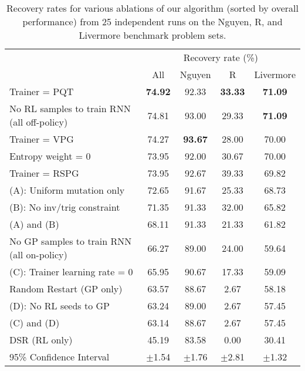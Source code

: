 \documentclass{article}
\begin{document}
\begin{table}[t]
  \centering
  \caption{Recovery rates for various ablations of our algorithm (sorted by overall performance) from 25 independent runs on the Nguyen, R, and Livermore benchmark problem sets.}
    \begin{tabular}{lcccc}
    & \multicolumn{4}{c}{Recovery rate (\%)} \\
    & All & Nguyen & R & Livermore \\
    \cmidrule{2-5}
    Trainer = PQT & \textbf{74.92} & 92.33 & \textbf{33.33} & \textbf{71.09} \\
    No RL samples to train RNN (all off-policy) & 74.81 & 93.00 & 29.33 & \textbf{71.09} \\
    Trainer = VPG & 74.27 & \textbf{93.67} & 28.00 & 70.00 \\
    Entropy weight = 0 & 73.95 & 92.00 & 30.67 & 70.00 \\
    Trainer = RSPG & 73.95 & 92.67 & 39.33 & 69.82 \\
    (A): Uniform mutation only & 72.65 & 91.67 & 25.33 & 68.73 \\
    (B): No inv/trig constraint & 71.35 & 91.33 & 32.00 & 65.82 \\
    (A) and (B) & 68.11 & 91.33 & 21.33 & 61.82 \\
    No GP samples to train RNN (all on-policy) & 66.27 & 89.00 & 24.00 & 59.64 \\
    (C): Trainer learning rate = 0 & 65.95 & 90.67 & 17.33 & 59.09 \\
    Random Restart (GP only) & 63.57 & 88.67 & 2.67  & 58.18 \\
    (D): No RL seeds to GP & 63.24 & 89.00 & 2.67  & 57.45 \\
    (C) and (D) & 63.14 & 88.67 & 2.67  & 57.45 \\
    DSR (RL only) \citep{petersen2019deep} & 45.19 & 83.58 & 0.00  & 30.41 \\
    \midrule
    95\% Confidence Interval & $\pm$1.54 & $\pm$1.76 & $\pm$2.81 & $\pm$1.32 \\
    \end{tabular}
  \label{tab:ablations}
\end{table}
\end{document}
